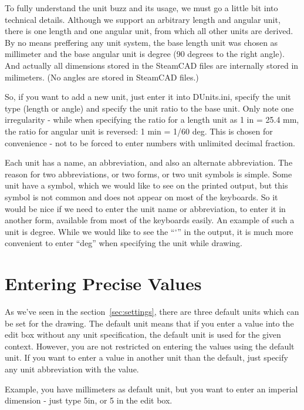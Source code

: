 \pagestyle{headings}

To fully understand the unit buzz and its usage, we must go a little bit into technical
details. Although we support an arbitrary length and angular unit, there is one length
and one angular unit, from which all other units are derived. By no means preffering
any unit system, the base length unit was chosen as millimeter and the base angular
unit is degree (90 degrees to the right angle). And actually all dimensions stored in the
SteamCAD files are internally stored in milimeters. (No angles are stored in SteamCAD
files.)

So, if you want to add a new unit, just enter it into DUnits.ini, specify the unit
type (length or angle) and specify the unit ratio to the base unit. Only note one
irregularity - while when specifying the ratio for a length unit as 1 in = 25.4 mm,
the ratio for angular unit is reversed: 1 min = 1/60 deg. This is chosen for
convenience - not to be forced to enter numbers with unlimited decimal fraction.

Each unit has a name, an abbreviation, and also an alternate abbreviation. The reason
for two abbreviations, or two forms, or two unit symbols is simple. Some unit have
a symbol, which we would like to see on the printed output, but this symbol is not
common and does not appear on most of the keyboards. So it would be nice if we need
to enter the unit name or abbreviation, to enter it in another form, available
from most of the keyboards easily. An example of such a unit is degree. While we would
like to see the ``$^{\circ}$'' in the output, it is much more convenient to enter ``deg''
when specifying the unit while drawing.


\section{Entering Precise Values}

As we've seen in the section~\ref{sec:settings}, there are three default units
which can be set for the drawing. The default unit means that if you enter a value
into the edit box without any unit specification, the default unit is used for
the given context. However, you are not restricted on entering the values using
the default unit. If you want to enter a value in another unit than the default,
just specify any unit abbreviation with the value.

Example, you have millimeters as default unit, but you want to enter an imperial
dimension - just type 5in, or 5\primitiveQuote{} in the edit box.

